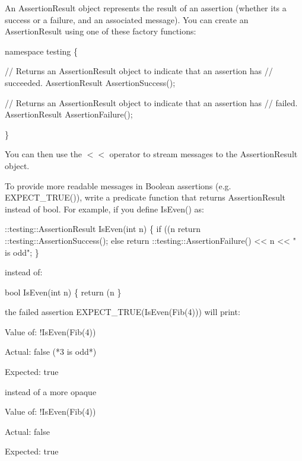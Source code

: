 An {\ttfamily Assertion\+Result} object represents the result of an assertion (whether it\textquotesingle{}s a success or a failure, and an associated message). You can create an {\ttfamily Assertion\+Result} using one of these factory functions\+:


\begin{DoxyCode}
namespace testing \{

// Returns an AssertionResult object to indicate that an assertion has
// succeeded.
AssertionResult AssertionSuccess();

// Returns an AssertionResult object to indicate that an assertion has
// failed.
AssertionResult AssertionFailure();

\}
\end{DoxyCode}


You can then use the {\ttfamily $<$$<$} operator to stream messages to the {\ttfamily Assertion\+Result} object.

To provide more readable messages in Boolean assertions (e.\+g. {\ttfamily E\+X\+P\+E\+C\+T\+\_\+\+T\+R\+U\+E()}), write a predicate function that returns {\ttfamily Assertion\+Result} instead of {\ttfamily bool}. For example, if you define {\ttfamily Is\+Even()} as\+:


\begin{DoxyCode}
::testing::AssertionResult IsEven(int n) \{
  if ((n %
    return ::testing::AssertionSuccess();
  else
    return ::testing::AssertionFailure() << n << " is odd";
\}
\end{DoxyCode}


instead of\+:


\begin{DoxyCode}
bool IsEven(int n) \{
  return (n %
\}
\end{DoxyCode}


the failed assertion {\ttfamily E\+X\+P\+E\+C\+T\+\_\+\+T\+R\+UE(Is\+Even(\+Fib(4)))} will print\+:


\begin{DoxyPre}
Value of: !IsEven(Fib(4))~\newline

Actual: false (*3 is odd*)~\newline

Expected: true~\newline

\end{DoxyPre}


instead of a more opaque


\begin{DoxyPre}
Value of: !IsEven(Fib(4))~\newline

Actual: false~\newline

Expected: true~\newline

\end{DoxyPre}


